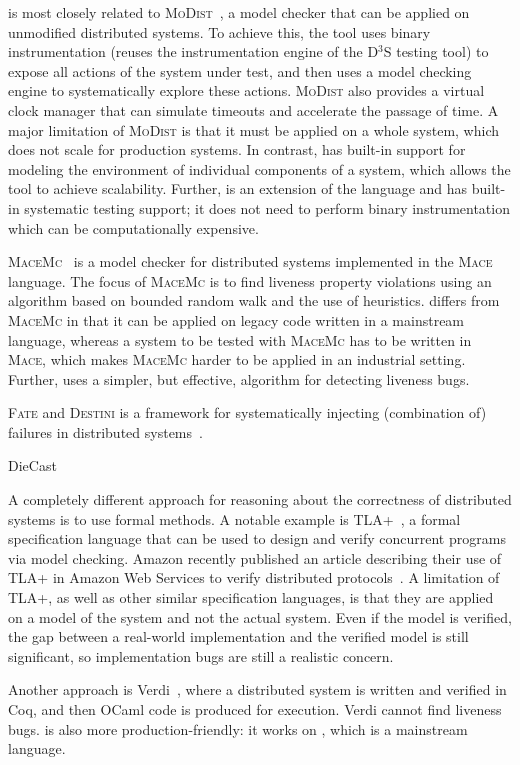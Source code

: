 \psharp is most closely related to \textsc{MoDist}~\cite{yang2009modist}, a model checker that can be applied on unmodified distributed systems. To achieve this, the tool uses binary instrumentation (reuses the instrumentation engine of the D$^3$S testing tool) to expose all actions of the system under test, and then uses a model checking engine to systematically explore these actions. \textsc{MoDist} also provides a virtual clock manager that can simulate timeouts and accelerate the passage of time. A major limitation of \textsc{MoDist} is that it must be applied on a whole system, which does not scale for production systems. In contrast, \psharp has built-in support for modeling the environment of individual components of a system, which allows the tool to achieve scalability. Further, \psharp is an extension of the \csharp language and has built-in systematic testing support; it does not need to perform binary instrumentation which can be computationally expensive.

\textsc{MaceMc}~\cite{killian2007life} is a model checker for distributed systems implemented in the \textsc{Mace} language. The focus of \textsc{MaceMc} is to find liveness property violations using an algorithm based on bounded random walk and the use of heuristics. \psharp differs from \textsc{MaceMc} in that it can be applied on legacy code written in a mainstream language, whereas a system to be tested with \textsc{MaceMc} has to be written in \textsc{Mace}, which makes \textsc{MaceMc} harder to be applied in an industrial setting. Further, \psharp uses a simpler, but effective, algorithm for detecting liveness bugs.

\textsc{Fate} and \textsc{Destini} is a framework for systematically injecting (combination of) failures in distributed systems~\cite{gunawi2011fate}.

DieCast~\cite{gupta2008diecast}

A completely different approach for reasoning about the correctness of distributed systems is to use formal methods.  A notable example is TLA+~\cite{lamport1994temporal}, a formal specification language that can be used to design and verify concurrent programs via model checking. Amazon recently published an article describing their use of TLA+ in Amazon Web Services to verify distributed protocols~\cite{newcombe2015aws}. A limitation of TLA+, as well as other similar specification languages, is that they are applied on a model of the system and not the actual system. Even if the model is verified, the gap between a real-world implementation and the verified model is still significant, so implementation bugs are still a realistic concern.

Another approach is Verdi~\cite{wilcox2015verdi}, where a distributed system is written and verified in Coq, and then OCaml code is produced for execution. Verdi cannot find liveness bugs. \psharp is also more production-friendly: it works on \csharp, which is a mainstream language.

